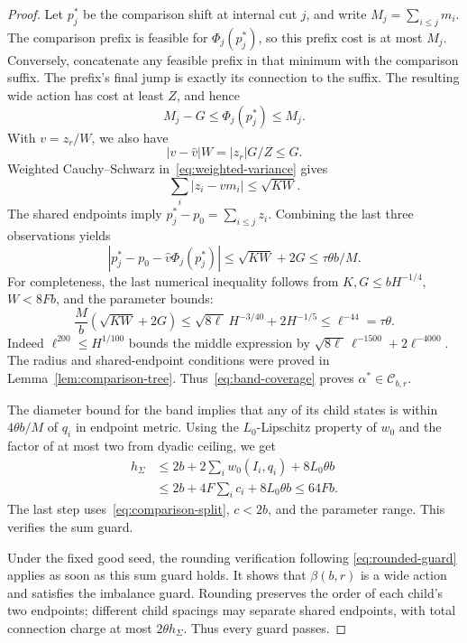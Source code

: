 \begin{proof}
Let $p_j^*$ be the comparison shift at internal cut $j$, and write
$M_j=\sum_{i\le j}m_i$.  The comparison prefix is feasible for
$\Phi_j(p_j^*)$, so this prefix cost is at most $M_j$.  Conversely, concatenate
any feasible prefix in that minimum with the comparison suffix.  The prefix's
final jump is exactly its connection to the suffix.  The resulting wide
action has cost at least $Z$, and hence
\[
 M_j-G\le\Phi_j(p_j^*)\le M_j.
\]
With $v=z_r/W$, we also have
\[
 |v-\widehat v|W=|z_r|G/Z\le G.
\]
Weighted Cauchy--Schwarz in~\eqref{eq:weighted-variance} gives
\[
 \sum_i|z_i-vm_i|\le\sqrt{KW}.
\]
The shared endpoints imply $p_j^*-p_0=\sum_{i\le j}z_i$.  Combining the last
three observations yields
\begin{equation}\label{eq:band-coverage}
 |p_j^*-p_0-\widehat v\Phi_j(p_j^*)|
 \le\sqrt{KW}+2G\le\tau\theta b/M.
\end{equation}
For completeness, the last numerical inequality follows from
$K,G\le bH^{-1/4}$, $W<8Fb$, and the parameter bounds:
\[
 \frac M b(\sqrt{KW}+2G)
 \le\sqrt{8\ell}\,H^{-3/40}+2H^{-1/5}
 \le\ell^{-44}=\tau\theta.
\]
Indeed $\ell^{200}\le H^{1/100}$ bounds the middle expression by
$\sqrt{8\ell}\,\ell^{-1500}+2\ell^{-4000}$.
The radius and shared-endpoint conditions were proved in
Lemma~\ref{lem:comparison-tree}.  Thus~\eqref{eq:band-coverage} proves
$\alpha^*\in\mathcal C_{b,r}$.

The diameter bound for the band implies that any of its child states is
within $4\theta b/M$ of $q_i$ in endpoint metric.  Using the
$L_0$-Lipschitz property of $w_0$ and the factor of at most two from dyadic
ceiling, we get
\[
 \begin{aligned}
 h_\Sigma
 &\le2b+2\sum_i w_0(I_i,q_i)+8L_0\theta b\\
 &\le2b+4F\sum_i c_i+8L_0\theta b
 \le64Fb.
 \end{aligned}
\]
The last step uses~\eqref{eq:comparison-split}, $c<2b$, and the parameter
range.  This verifies the sum guard.

Under the fixed good seed, the rounding verification following
\eqref{eq:rounded-guard} applies as soon as this sum guard holds.
It shows that $\beta(b,r)$ is a wide action and satisfies the imbalance
guard.  Rounding preserves the order of each child's two endpoints;
different child spacings may separate shared endpoints, with total
connection charge at most $2\theta h_\Sigma$.  Thus every guard passes.
\end{proof}
